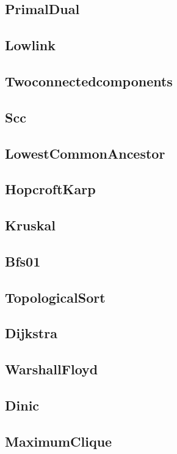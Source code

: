\documentclass[titlepage, landscape, a4paper, twocolumn, 10pt]{ujarticle}
\begin{document}
\subsection{PrimalDual}


\subsection{Lowlink}


\subsection{Twoconnectedcomponents}


\subsection{Scc}


\subsection{LowestCommonAncestor}


\subsection{HopcroftKarp}


\subsection{Kruskal}


\subsection{Bfs01}


\subsection{TopologicalSort}


\subsection{Dijkstra}


\subsection{WarshallFloyd}


\subsection{Dinic}


\subsection{MaximumClique}

\end{document}
